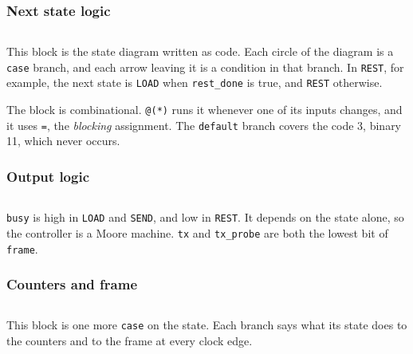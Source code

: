 \documentclass[11pt,a4paper]{article}
\begin{document}
\subsubsection*{Next state logic}

\inputminted[firstline=38, lastline=45]{verilog}{../rtl/hello/hello.v}

This block is the state diagram written as code. Each circle of the diagram is a \texttt{case} branch, and each arrow leaving it is a condition in that branch. In \texttt{REST}, for example, the next state is \texttt{LOAD} when \texttt{rest\_done} is true, and \texttt{REST} otherwise.

The block is combinational. \texttt{@(*)} runs it whenever one of its inputs changes, and it uses \texttt{=}, the \emph{blocking} assignment. The \texttt{default} branch covers the code 3, binary 11, which never occurs.

\subsubsection*{Output logic}

\inputminted[firstline=47, lastline=50]{verilog}{../rtl/hello/hello.v}

\texttt{busy} is high in \texttt{LOAD} and \texttt{SEND}, and low in \texttt{REST}. It depends on the state alone, so the controller is a Moore machine. \texttt{tx} and \texttt{tx\_probe} are both the lowest bit of \texttt{frame}.

\subsubsection*{Counters and frame}

\inputminted[firstline=52, lastline=74]{verilog}{../rtl/hello/hello.v}

This block is one more \texttt{case} on the state. Each branch says what its state does to the counters and to the frame at every clock edge.
\end{document}
